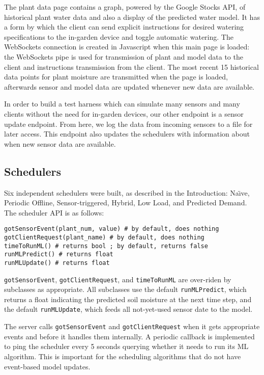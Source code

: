 \documentclass[a4paper]{acm_proc_article-sp}
\begin{document}
The plant data page contains a graph, powered by the Google Stocks API, of historical plant water data and also a display of the predicted water model.  It has a form by which the client can send explicit instructions for desired watering specifications to the in-garden device and toggle automatic watering.  The WebSockets connection is created in Javascript when this main page is loaded: the WebSockets pipe is used for transmission of plant and model data to the client and instructions transmission from the client.  The most recent 15 historical data points for plant moisture are transmitted when the page is loaded, afterwards sensor and model data are updated whenever new data are available.

In order to build a test harness which can simulate many sensors and many clients without the need for in-garden devices, our other endpoint is a sensor update endpoint.  From here, we log the data from incoming sensors to a file for later access.  This endpoint also updates the schedulers with information about when new sensor data are available.

\subsection{Schedulers}

Six independent schedulers were built, as described in the Introduction: Na\"{\i}ve, Periodic Offline, Sensor-triggered, Hybrid, Low Load, and Predicted Demand.  The scheduler API is as follows:

\begin{lstlisting}
gotSensorEvent(plant_num, value) # by default, does nothing
gotClientRequest(plant_name) # by default, does nothing
timeToRunML() # returns bool ; by default, returns false
runMLPredict() # returns float
runMLUpdate() # returns float
\end{lstlisting}

\lstinline|gotSensorEvent|, \lstinline|gotClientRequest|, and \lstinline|timeToRunML| are over-riden by subclasses as appropriate.  All subclasses use the default \lstinline|runMLPredict|, which returns a float indicating the predicted soil moisture at the next time step, and the default \lstinline|runMLUpdate|, which feeds all not-yet-used sensor date to the model.

The server calls \lstinline|gotSensorEvent| and \lstinline|gotClientRequest| when it gets appropriate events and before it handles them internally.  A periodic callback is implemented to ping the scheduler every 5 seconds querying whether it needs to run its ML algorithm.  This is important for the scheduling algorithms that do not have event-based model updates.
\end{document}
